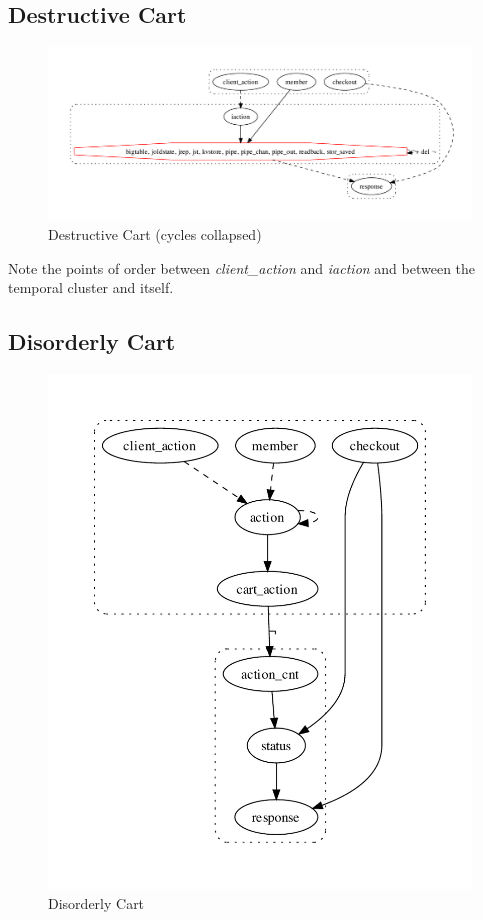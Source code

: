 \subsection{Destructive Cart}

\begin{figure}[t]
\centering
\includegraphics[width=1.2\linewidth]{fig/ImperativeCartServer_gvoutput.pdf}
\caption{Destructive Cart (cycles collapsed)}
\label{fig:cs-pgd-1}
\end{figure}

Note the points of order between \emph{client\_action} and \emph{iaction}
and between the temporal cluster and itself.



\subsection{Disorderly Cart}

\begin{figure}[t]
\centering
\includegraphics[width=0.9\linewidth]{fig/BasicCartServer_gvoutput.pdf}
\caption{Disorderly Cart}
\label{fig:cs-pgd-1}
\end{figure}




